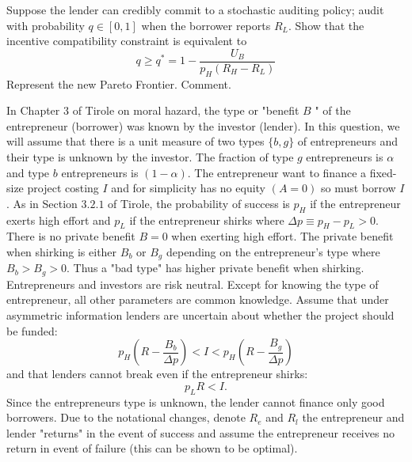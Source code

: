 \documentclass[12pt]{article}
\begin{document}
\begin{subexercise}
    Suppose the lender can credibly commit to a stochastic auditing policy; audit with probability $q \in[0,1]$ when the borrower reports $R_{L}$. Show that the incentive compatibility constraint is equivalent to
    $$
    q \geq q^{*}=1-\frac{U_{B}}{p_H\left(R_{H}-R_{L}\right)}
    $$
    Represent the new Pareto Frontier. Comment.
\end{subexercise}
\begin{answer}

\end{answer}

\begin{exercise}
    In Chapter 3 of Tirole on moral hazard, the type or "benefit $B$ " of the entrepreneur (borrower) was known 
    by the investor (lender). In this question, we will assume that there is a unit measure of two types $\{b, g\}$ 
    of entrepreneurs and their type is unknown by the investor. The fraction of type $g$ entrepreneurs is $\alpha$ 
    and type $b$ entrepreneurs is $(1-\alpha)$. The entrepreneur want to finance a fixed-size project costing $I$ and
     for simplicity has no equity $(A=0)$ so must borrow $I$. As in Section $3.2 .1$ of Tirole, the probability of success 
     is $p_H$ if the entrepreneur exerts high effort and $p_L$ if the entrepreneur shirks where 
     $\Delta p \equiv p_H-p_L>0$. There is no private benefit $B=0$ when exerting high effort. 
     The private benefit when shirking is either $B_{b}$ or $B_{g}$ depending on the entrepreneur's type where $B_{b}>B_{g}>0$. Thus a "bad type" has higher private benefit when shirking. Entrepreneurs and investors are risk neutral. Except for knowing the type of entrepreneur, all other parameters are common knowledge. Assume that under asymmetric information lenders are uncertain about whether the project should be funded:
     $$
     p_H\left(R-\frac{B_{b}}{\Delta p}\right)<I<p_H\left(R-\frac{B_{g}}{\Delta p}\right)
     $$
     and that lenders cannot break even if the entrepreneur shirks:
     $$
     p_L R<I.
     $$
     Since the entrepreneurs type is unknown, the lender cannot finance only good borrowers. Due to the notational changes, denote $R_{e}$ and $R_{l}$ the entrepreneur and lender "returns" in the event of success and assume the entrepreneur receives no return in event of failure (this can be shown to be optimal).
    \end{exercise}
\end{document}
